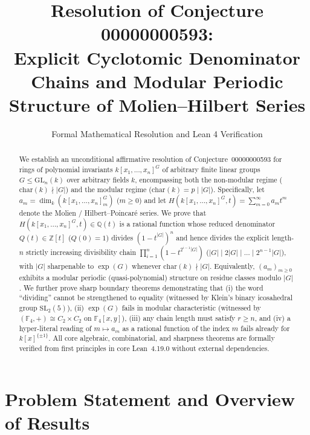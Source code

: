 \documentclass[11pt]{article}
\title{\textbf{Resolution of Conjecture 00000000593:\\
Explicit Cyclotomic Denominator Chains and Modular Periodic Structure of Molien--Hilbert Series}}
\author{Formal Mathematical Resolution and Lean 4 Verification}
\date{}
\theoremstyle{definition}
\theoremstyle{remark}
\begin{document}
\maketitle

\begin{abstract}
We establish an unconditional affirmative resolution of Conjecture~00000000593 for rings of polynomial invariants $k[x_1,\dots,x_n]^G$ of arbitrary finite linear groups $G \le \mathrm{GL}_n(k)$ over arbitrary fields $k$, encompassing both the non-modular regime ($\mathrm{char}(k) \nmid |G|$) and the modular regime ($\mathrm{char}(k) = p \mid |G|$). Specifically, let $a_m = \dim_k(k[x_1,\dots,x_n]_m^G)$ ($m \ge 0$) and let $H(k[x_1,\dots,x_n]^G, t) = \sum_{m=0}^{\infty} a_m t^m$ denote the Molien / Hilbert--Poincar\'e series. We prove that $H(k[x_1,\dots,x_n]^G, t) \in \mathbb{Q}(t)$ is a rational function whose reduced denominator $Q(t) \in \mathbb{Z}[t]$ ($Q(0)=1$) divides $(1 - t^{|G|})^n$ and hence divides the explicit length-$n$ strictly increasing divisibility chain $\prod_{i=1}^{n} (1 - t^{2^{i-1}|G|})$ ($|G| \mid 2|G| \mid \dots \mid 2^{n-1}|G|$), with $|G|$ sharpenable to $\exp(G)$ whenever $\mathrm{char}(k) \nmid |G|$. Equivalently, $(a_m)_{m \ge 0}$ exhibits a modular periodic (quasi-polynomial) structure on residue classes modulo $|G|$. We further prove sharp boundary theorems demonstrating that (i) the word ``dividing'' cannot be strengthened to equality (witnessed by Klein's binary icosahedral group $\mathrm{SL}_2(5)$), (ii) $\exp(G)$ fails in modular characteristic (witnessed by $(\mathbb{F}_4,+) \cong C_2 \times C_2$ on $\mathbb{F}_4[x,y]$), (iii) any chain length must satisfy $r \ge n$, and (iv) a hyper-literal reading of $m \mapsto a_m$ as a rational function of the index $m$ fails already for $k[x]^{\{\pm 1\}}$. All core algebraic, combinatorial, and sharpness theorems are formally verified from first principles in core Lean~4.19.0 without external dependencies.
\end{abstract}

\section{Problem Statement and Overview of Results}
\end{document}
